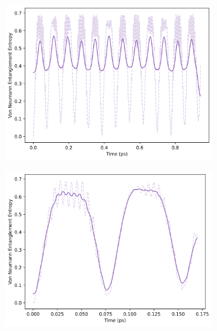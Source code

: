 \documentclass[11pt]{article}
\begin{document}
\begin{figure}[H]
    \centering
    \begin{subfigure}{0.49\textwidth}
        \centering
        \includegraphics[width=\linewidth]{Research Project/Code/results/ExVib/Closed/Envelope/vne.png}
        \caption{}
        \label{fig:EVM_CQS_Ent_env}
    \end{subfigure}
    \hfill
    \begin{subfigure}{0.49\textwidth}
        \centering
        \includegraphics[width=\linewidth]{Research Project/Code/results/ExVib/Closed/Fast/vne.png}
        \caption{}
        \label{fig:EVM_CQS_Ent_fast}
    \end{subfigure}
    
    \caption{}
    \label{fig:EVM_CQS_Ent}
\end{figure}
\end{document}

